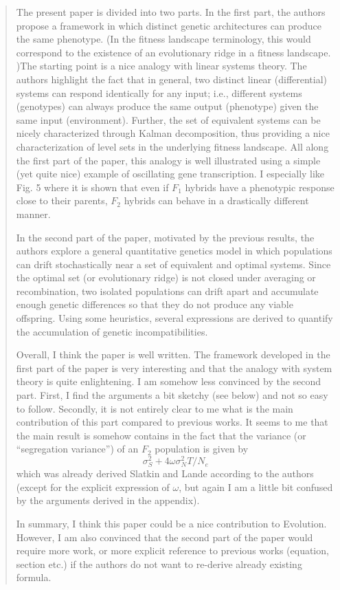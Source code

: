 
\begin{quote}
The present paper is divided into two parts. In the first part, the authors propose a framework
in which distinct genetic architectures can produce the same phenotype. (In the fitness landscape
terminology, this would correspond to the existence of an evolutionary ridge in a fitness landscape.
)The starting point is a nice analogy with linear systems theory. The authors highlight the fact
that in general, two distinct linear (differential) systems can respond identically for any input; i.e.,
different systems (genotypes) can always produce the same output (phenotype) given the same input
(environment). Further, the set of equivalent systems can be nicely characterized through Kalman
decomposition, thus providing a nice characterization of level sets in the underlying fitness landscape.
All along the first part of the paper, this analogy is well illustrated using a simple (yet quite nice)
example of oscillating gene transcription. I especially like Fig. 5 where it is shown that even if $F_1$
hybrids have a phenotypic response close to their parents, $F_2$ hybrids can behave in a drastically
different manner.

In the second part of the paper, motivated by the previous results, the authors explore a general
quantitative genetics model in which populations can drift stochastically near a set of equivalent
and optimal systems. Since the optimal set (or evolutionary ridge) is not closed under averaging or
recombination, two isolated populations can drift apart and accumulate enough genetic differences
so that they do not produce any viable offspring. Using some heuristics, several expressions are
derived to quantify the accumulation of genetic incompatibilities.

Overall, I think the paper is well written. The framework developed in the first part of the paper
is very interesting and that the analogy with system theory is quite enlightening. I am somehow
less convinced by the second part. First, I find the arguments a bit sketchy (see below) and not so
easy to follow. Secondly, it is not entirely clear to me what is the main contribution of this part
compared to previous works. It seems to me that the main result is somehow contains in the fact
that the variance (or ``segregation variance'') of an $F_2$ population is given by
$$\sigma^2_S + 4 \omega \sigma^2_N T / N_e$$
which was already derived Slatkin and Lande according to the authors (except for the explicit
expression of $\omega$, but again I am a little bit confused by the arguments derived in the appendix).

In summary, I think this paper could be a nice contribution to Evolution. However, I am also
convinced that the second part of the paper would require more work, or more explicit reference
to previous works (equation, section etc.) if the authors do not want to re-derive already existing
formula.
\end{quote}

